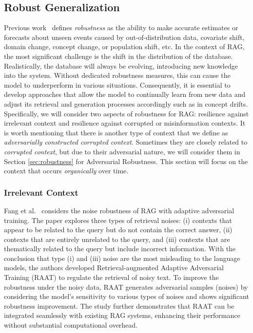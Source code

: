 \subsection{Robust Generalization}
Previous work~\cite{tran2022plex} defines \textit{robustness} as the ability to make accurate estimates or forecasts about unseen events caused by out-of-distribution data, covariate shift, domain change, concept change, or population shift, etc. In the context of RAG, the most significant challenge is the shift in the distribution of the database. Realistically, the database will always be evolving, introducing new knowledge into the system. Without dedicated robustness measures, this can cause the model to underperform in various situations. Consequently, it is essential to develop approaches that allow the model to continually learn from new data and adjust its retrieval and generation processes accordingly such as in concept drifts.  Specifically, we will consider two aspects of robustness for RAG: resilience against irrelevant context and resilience against corrupted or misinformation contexts. It is worth mentioning that there is another type of context that we define as \textit{adversarially constructed corrupted context}. Sometimes they are closely related to \textit{corrupted context}, but due to their adversarial nature, we will consider them in Section \ref{sec:robustness} for Adversarial Robustness. This section will focus on the context that occurs \textit{organically} over time. 

\subsubsection{Irrelevant Context}

Fang et al.~\cite{adaptive_adversarial_rag_2024} considers the noise robustness of RAG with adaptive adversarial training. The paper explores three types of retrieval noises: (i) contexts that appear to be related to the query but do not contain the correct answer, (ii) contexts that are entirely unrelated to the query, and (iii) contexts that are thematically related to the query but include incorrect information. With the conclusion that type (i) and (iii) noise are the most misleading to the language models, the authors developed Retrieval-augmented Adaptive Adversarial Training (RAAT) to regulate the retrieval of noisy text. To improve the robustness under the noisy data, RAAT generates adversarial samples (noises) by considering the model's sensitivity to various types of noises and shows significant robustness improvement. The study further demonstrates that RAAT can be integrated seamlessly with existing RAG systems, enhancing their performance without substantial computational overhead. 

